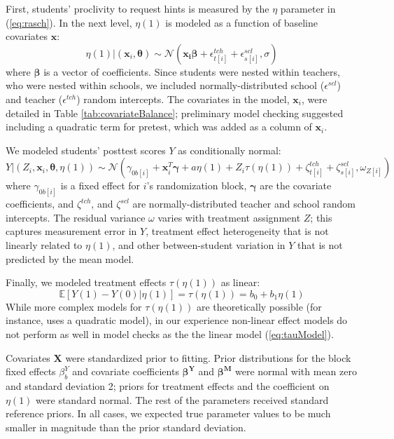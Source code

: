 \documentclass{article}\usepackage[]{graphicx}\usepackage[]{color}
\newcommand{\EE}{\mathbb{E}}
\begin{document}
First, students' proclivity to request hints is measured by the $\eta$
parameter in (\ref{eq:rasch}).
In the next level, $\eta(1)$ is modeled as a function of baseline
covariates $\bm{x}$:
\begin{equation}\label{eq:rasch2}
\eta(1)|\left(\bm{x}_i,\bm{\theta}\right) \sim
\mathcal{N}\left(\bm{x_i}\bm{\beta}+\epsilon^{tch}_{t[i]}+\epsilon^{scl}_{s[i]},
\sigma\right)
\end{equation}
where $\bm{\beta}$ is a vector of coefficients.
Since students were nested within teachers, who were nested within
schools, we included normally-distributed school ($\epsilon^{scl}$) and
teacher ($\epsilon^{tch}$) random intercepts.
The covariates in the model, $\bm{x}_i$, were detailed in Table
\ref{tab:covariateBalance}; preliminary model checking suggested
including a quadratic term for pretest, which was added as a column of
$\bm{x}_i$.

We modeled students' posttest scores $Y$ as
conditionally normal:
\begin{equation}\label{eq:outcomeSubmodel}
 Y|\left(Z_i,\bm{x}_i,\bm{\theta},\eta(1)\right) \sim  \mathcal{N}\left(
\gamma_{0b[i]}+\bm{x}_i^T\bm{\gamma}+a\eta(1)+Z_i\tau(\eta(1))+\zeta^{tch}_{t[i]}+\zeta^{scl}_{s[i]},\omega_{Z[i]}\right)
\end{equation}
where $\gamma_{0b[i]}$ is a fixed effect for $i$'s randomization block, $\bm{\gamma}$ are the
covariate coefficients, and $\zeta^{tch}$, and
$\zeta^{scl}$ are normally-distributed teacher and school random
intercepts.
The residual variance $\omega$ varies with treatment assignment $Z$;
this captures measurement error in $Y$, treatment effect heterogeneity
that is not linearly related to
$\eta(1)$, and other between-student variation in $Y$ that is not predicted by
the mean model.

Finally, we modeled treatment effects
$\tau(\eta(1))$ as linear:
\begin{equation}\label{eq:tauModel}
\EE[Y(1)-Y(0)|\eta(1)]=\tau({\eta(1)})=b_0+b_1\eta(1)
\end{equation}
While more complex models for $\tau(\eta(1))$ are theoretically
possible (for instance, \citet{jin2008principal} uses a quadratic
model), in our experience non-linear effect models do not perform as
well in model checks as the the linear model (\ref{eq:tauModel}).

Covariates $\bm{X}$ were standardized prior to fitting.
Prior distributions for the block fixed effects $\beta^Y_b$ and covariate coefficients
$\bm{\beta^Y}$ and $\bm{\beta^M}$ were normal with mean zero and
standard deviation 2;
priors for treatment effects and the coefficient on $\eta(1)$ were standard
normal.
The rest of the parameters received standard reference priors.
In all cases, we expected true parameter values to be much smaller in
magnitude than the prior standard deviation.
\end{document}
